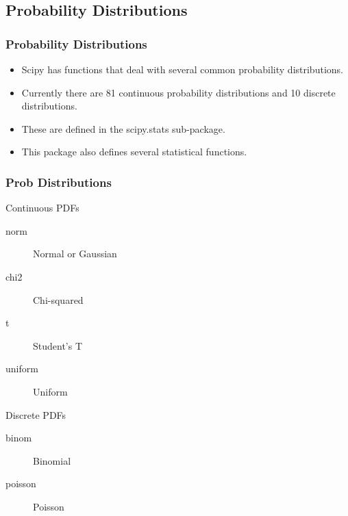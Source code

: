 \documentclass[10pt,colorlinks]{beamer}
\begin{document}
\subsection{Probability Distributions} %
\label{ssub:Probability Distributions}

\begin{frame}[fragile]\frametitle{Probability Distributions}
  \begin{block}{}
  \begin{itemize}
      \item  Scipy has functions that deal with several common probability distributions. 
        \item Currently there are 81 continuous probability distributions and 10 discrete distributions. 
        \item These are defined in the scipy.stats sub-package. 
        \item This package also defines several statistical functions.
    \end{itemize} 
  \end{block}
\end{frame}

\begin{frame}[fragile]\frametitle{ Prob Distributions}
\begin{block}{Continuous PDFs}
 \begin{description}
      \item[norm] Normal or Gaussian
    \item[chi2] Chi-squared
    \item[t] Student's T
    \item[uniform] Uniform
  \end{description}
\end{block} 

\begin{block}{Discrete PDFs}
\begin{description}
    \item[binom] Binomial
    \item[poisson] Poisson 
\end{description}
\end{block}
\end{frame}
\end{document}
